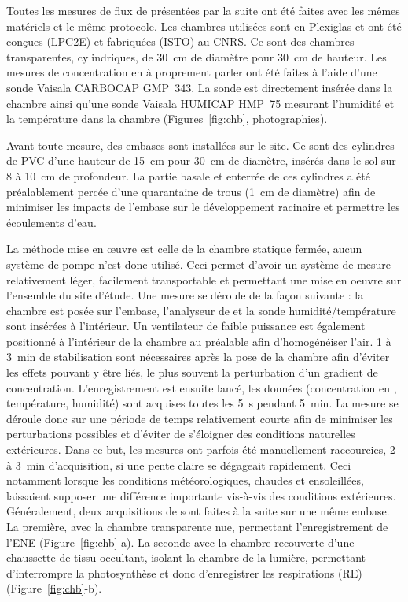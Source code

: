 Toutes les mesures de flux de \coo présentées par la suite ont été faites avec les mêmes matériels et le même protocole.
Les chambres utilisées sont en Plexiglas\textsuperscript{\textregistered} et ont été conçues (LPC2E) et fabriquées (ISTO) au CNRS.
Ce sont des chambres transparentes, cylindriques, de \SI{30}{\centi\metre} de diamètre pour \SI{30}{\centi\metre} de hauteur.
Les mesures de concentration en \coo à proprement parler ont été faites à l'aide d'une sonde Vaisala CARBOCAP\textsuperscript{\textregistered} GMP~343.
La sonde est directement insérée dans la chambre ainsi qu'une sonde Vaisala HUMICAP\textsuperscript{\textregistered} HMP~75 mesurant l'humidité et la température dans la chambre (Figures~\ref{fig:chb}, photographies).

Avant toute mesure, des embases sont installées sur le site.
Ce sont des cylindres de PVC d'une hauteur de \SI{15}{\centi\metre} pour \SI{30}{\centi\metre} de diamètre, insérés dans le sol sur 8 à \SI{10}{\centi\metre} de profondeur.
La partie basale et enterrée de ces cylindres a été préalablement percée d'une quarantaine de trous (\SI{1}{\centi\metre} de diamètre) afin de minimiser les impacts de l'embase sur le développement racinaire et permettre les écoulements d'eau.

La méthode mise en œuvre est celle de la chambre statique fermée, aucun système de pompe n'est donc utilisé.
Ceci permet d'avoir un système de mesure relativement léger, facilement transportable et permettant une mise en oeuvre sur l'ensemble du site d'étude.
Une mesure se déroule de la façon suivante :
la chambre est posée sur l'embase, l'analyseur de \coo et la sonde humidité/température sont insérées à l'intérieur.
Un ventilateur de faible puissance est également positionné à l'intérieur de la chambre au préalable afin d'homogénéiser l'air.
1 à \SI{3}{\minute} de stabilisation sont nécessaires après la pose de la chambre afin d'éviter les effets pouvant y être liés, le plus souvent la perturbation d'un gradient de concentration.
L’enregistrement est ensuite lancé, les données (concentration en \coo, température, humidité) sont acquises toutes les \SI{5}{\second} pendant \SI{5}{\minute}.
La mesure se déroule donc sur une période de temps relativement courte afin de minimiser les perturbations possibles et d'éviter de s'éloigner des conditions naturelles extérieures.
Dans ce but, les mesures ont parfois été manuellement raccourcies, 2 à \SI{3}{\minute} d'acquisition, si une pente claire se dégageait rapidement.
Ceci notamment lorsque les conditions météorologiques, chaudes et ensoleillées, laissaient supposer une différence importante vis-à-vis des conditions extérieures.
Généralement, deux acquisitions de \coo sont faites à la suite sur une même embase.
La première, avec la chambre transparente nue, permettant l'enregistrement de l'ENE (Figure~\ref{fig:chb}-a).
La seconde avec la chambre recouverte d'une chaussette de tissu occultant, isolant la chambre de la lumière, permettant d'interrompre la photosynthèse et donc d'enregistrer les respirations (RE) (Figure~\ref{fig:chb}-b).

